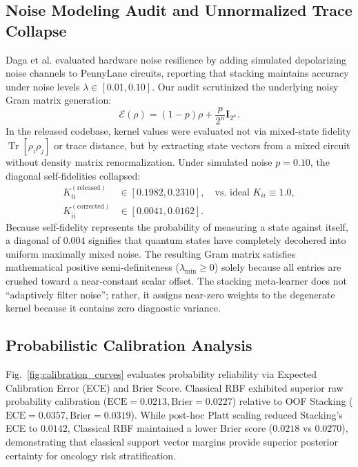 \documentclass[journal,twocolumn]{IEEEtran}
\DeclareMathOperator{\Tr}{Tr}
\begin{document}
\subsection{Noise Modeling Audit and Unnormalized Trace Collapse}
Daga et al. evaluated hardware noise resilience by adding simulated depolarizing noise channels to PennyLane circuits, reporting that stacking maintains accuracy under noise levels $\lambda \in [0.01, 0.10]$. Our audit scrutinized the underlying noisy Gram matrix generation:
\begin{equation}
\mathcal{E}(\rho) = (1 - p)\rho + \frac{p}{2^n} \mathbf{I}_{2^n}.
\end{equation}
In the released codebase, kernel values were evaluated not via mixed-state fidelity $\Tr[\rho_i \rho_j]$ or trace distance, but by extracting state vectors from a mixed circuit without density matrix renormalization. Under simulated noise $p=0.10$, the diagonal self-fidelities collapsed:
\begin{align}
K_{ii}^{(\text{released})} &\in [0.1982, 0.2310], \quad \text{vs. ideal } K_{ii} \equiv 1.0, \label{eq:released_diag} \\
K_{ii}^{(\text{corrected})} &\in [0.0041, 0.0162]. \label{eq:corrected_diag}
\end{align}
Because self-fidelity represents the probability of measuring a state against itself, a diagonal of $0.004$ signifies that quantum states have completely decohered into uniform maximally mixed noise. The resulting Gram matrix satisfies mathematical positive semi-definiteness ($\lambda_{\min} \ge 0$) solely because all entries are crushed toward a near-constant scalar offset. The stacking meta-learner does not ``adaptively filter noise''; rather, it assigns near-zero weights to the degenerate kernel because it contains zero diagnostic variance.

\subsection{Probabilistic Calibration Analysis}
Fig.~\ref{fig:calibration_curves} evaluates probability reliability via Expected Calibration Error (ECE) and Brier Score. Classical RBF exhibited superior raw probability calibration ($\text{ECE} = 0.0213, \text{Brier} = 0.0227$) relative to OOF Stacking ($\text{ECE} = 0.0357, \text{Brier} = 0.0319$). While post-hoc Platt scaling reduced Stacking's ECE to $0.0142$, Classical RBF maintained a lower Brier score ($0.0218$ vs $0.0270$), demonstrating that classical support vector margins provide superior posterior certainty for oncology risk stratification.
\end{document}
